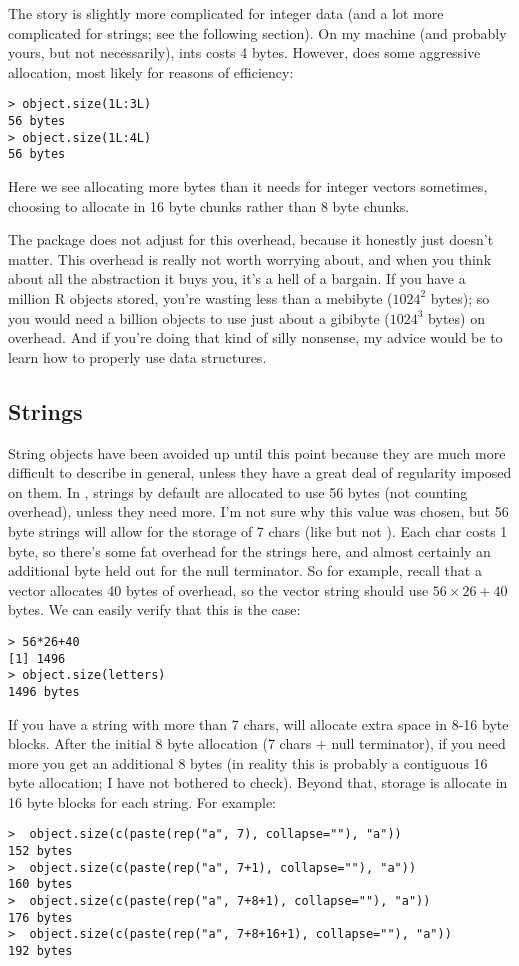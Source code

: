 The story is slightly more complicated for integer data (and a lot more complicated for strings; see the following section).  On my machine (and probably yours, but not necessarily), ints costs 4 bytes.  However,  does some aggressive allocation, most likely for reasons of efficiency:
\begin{lstlisting}[language=rr]
> object.size(1L:3L)
56 bytes
> object.size(1L:4L)
56 bytes
\end{lstlisting}
Here we see  allocating more bytes than it needs for integer vectors sometimes, choosing to allocate in 16 byte chunks rather than 8 byte chunks.

The  package does not adjust for this overhead, because it honestly just doesn't matter.  This overhead is really not worth worrying about, and when you think about all the abstraction it buys you, it's a hell of a bargain.  If you have a million R objects stored, you're wasting less than a mebibyte ($1024^2$ bytes); so you would need a billion objects to use just about a gibibyte ($1024^3$ bytes) on overhead.  And if you're doing that kind of silly nonsense, my advice would be to learn how to properly use data structures.



\subsection{Strings}

String objects have been avoided up until this point because they are much more difficult to describe in general, unless they have a great deal of regularity imposed on them.  In , strings by default are allocated to use 56 bytes (not counting overhead), unless they need more.  I'm not sure why this value was chosen, but 56 byte strings will allow for the storage of 7 chars (like  but not ).  Each char costs 1 byte, so there's some fat overhead for the strings here, and almost certainly an additional byte held out for the null terminator.  So for example, recall that a vector allocates 40 bytes of overhead, so the vector string  should use $56\times 26 + 40$ bytes.  We can easily verify that this is the case:
\begin{lstlisting}[language=rr]
> 56*26+40
[1] 1496
> object.size(letters)
1496 bytes
\end{lstlisting}

If you have a string with more than 7 chars,  will allocate extra space in 8-16 byte blocks.  After the initial 8 byte allocation (7 chars $+$ null terminator), if you need more you get an additional 8 bytes (in reality this is probably a contiguous 16 byte allocation; I have not bothered to check).  Beyond that, storage is allocate in 16 byte blocks for each string.  For example:
\begin{lstlisting}[language=rr]
>  object.size(c(paste(rep("a", 7), collapse=""), "a")) 
152 bytes
>  object.size(c(paste(rep("a", 7+1), collapse=""), "a")) 
160 bytes
>  object.size(c(paste(rep("a", 7+8+1), collapse=""), "a")) 
176 bytes
>  object.size(c(paste(rep("a", 7+8+16+1), collapse=""), "a")) 
192 bytes
\end{lstlisting}


